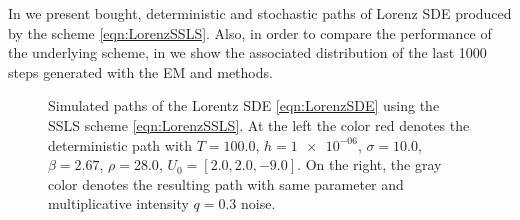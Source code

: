 	In  we present bought, deterministic and stochastic paths of Lorenz
SDE  produced by the \SM scheme \eqref{eqn:LorenzSSLS}. Also, in order to compare
the performance of the underlying scheme, in  we show the associated 
distribution of the last \num{1000} steps generated with the EM and \SM methods.
%
\begin{figure}[h!]
	\caption{Simulated paths of the Lorentz SDE \eqref{eqn:LorenzSDE} using the SSLS scheme
		\eqref{eqn:LorenzSSLS}. At the left the color red denotes the deterministic path with 
		$T = 100.0$,
		$h = \num{1e-06}$,
		$\sigma = \num{10.0}$,
		$\beta = \num{2.67}$,
		$\rho = \num{28.0}$,
		$U_0 = [\num{2.0}, \num{2.0}, \num{-9.0}]$.
		On the right, the gray color denotes the resulting path with same parameter and multiplicative 
		intensity $q = \num{0.3}$ noise.
	}\label{fig:LorenzPaths}
\end{figure}
